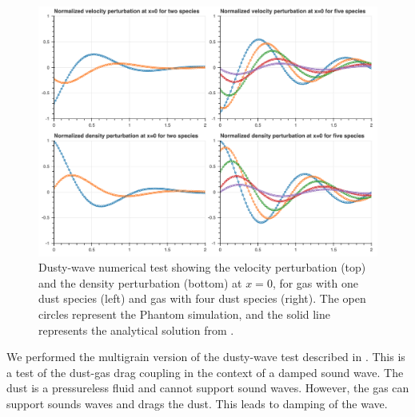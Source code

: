 \documentclass[fleqn,usenatbib]{mnras}
\begin{document}
\begin{figure}
   \begin{center}
      \includegraphics[width=\textwidth]{figs/dustywave.png}
      \caption{Dusty-wave numerical test showing the velocity perturbation (top)
         and the density perturbation (bottom) at \(x = 0\), for gas with one
         dust species (left) and gas with four dust species (right). The open
         circles represent the Phantom simulation, and the solid line represents
         the analytical solution from
         \citet{Benitez-Llambay2019ApJS..241...25B}.\label{fig:dustywave}}
   \end{center}
\end{figure}

We performed the multigrain version of the dusty-wave test described in
\citet{Laibe2011MNRAS.418.1491L}. This is a test of the dust-gas drag coupling
in the context of a damped sound wave. The dust is a pressureless fluid and
cannot support sound waves. However, the gas can support sounds waves and drags
the dust. This leads to damping of the wave.
\end{document}
